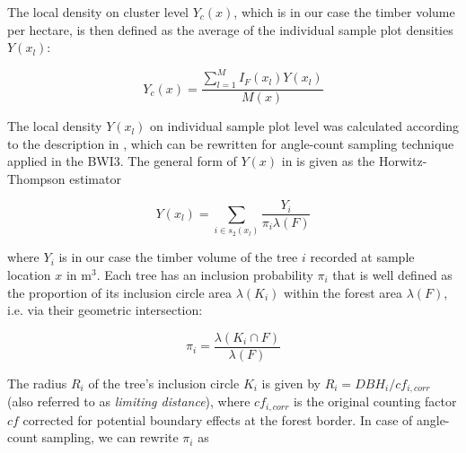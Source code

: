 The local density on cluster level $Y_{c}(x)$, which is in our case the timber volume per hectare, is then defined as the average of the individual sample plot densities $Y(x_l)$:

\begin{equation}\label{eq:locdens_clust}
Y_{c}(x) = \frac{\sum_{l=1}^{M} I_{F}(x_{l}) Y(x_l)}{M(x)}
\end{equation}

The local density $Y(x_l)$ on individual sample plot level was calculated according to the description in \citet{mandallaz2008}, which can be rewritten for angle-count sampling technique applied in the BWI3. The general form of $Y(x)$ in \citet{mandallaz2008} is given as the Horwitz-Thompson estimator 


\begin{equation}\label{eq:locdens_plot}
Y(x_l)=\sum_{i \in s_{2}(x_l)}\frac{Y_i}{\pi_{i}\lambda(F)}
\end{equation}

\noindent where $Y_i$ is in our case the timber volume of the tree $i$ recorded at sample location $x$ in m$^3$. Each tree has an inclusion probability $\pi_{i}$ that is well defined as the proportion of its inclusion circle area $\lambda(K_i)$ within the forest area $\lambda(F)$, i.e. via their geometric intersection:

%

\begin{equation}\label{locdens_plot_1}
\pi_{i} = \frac{\lambda(K_i \cap F)}{\lambda(F)}
\end{equation}

The radius $R_i$ of the tree's inclusion circle $K_i$ is given by $R_i = DBH_{i}/cf_{i,corr}$ (also referred to as \textit{limiting distance}), where $cf_{i,corr}$ is the original counting factor $cf$ corrected for potential boundary effects at the forest border. In case of angle-count sampling, we can rewrite $\pi_{i}$ as

